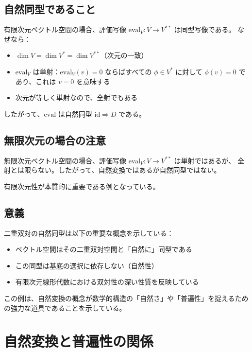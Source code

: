 \documentclass[uplatex,a4j,12pt,dvipdfmx]{jsarticle}
\begin{document}
\subsection{自然同型であること}

有限次元ベクトル空間の場合、評価写像 $\mathrm{eval}_V: V \to V^{**}$ は同型写像である。
なぜなら：
\begin{itemize}
	\item $\dim V = \dim V^* = \dim V^{**}$（次元の一致）
	\item $\mathrm{eval}_V$ は単射：$\mathrm{eval}_V(v) = 0$ ならばすべての $\phi \in V^*$ に対して $\phi(v) = 0$ であり、これは $v = 0$ を意味する
	\item 次元が等しく単射なので、全射でもある
\end{itemize}

したがって、$\mathrm{eval}$ は自然同型 $\mathrm{id} \Rightarrow D$ である。

\subsection{無限次元の場合の注意}

無限次元ベクトル空間の場合、評価写像 $\mathrm{eval}_V: V \to V^{**}$ は単射ではあるが、
全射とは限らない。したがって、自然変換ではあるが自然同型ではない。

有限次元性が本質的に重要である例となっている。

\subsection{意義}

二重双対の自然同型は以下の重要な概念を示している：
\begin{itemize}
	\item ベクトル空間はその二重双対空間と「自然に」同型である
	\item この同型は基底の選択に依存しない（自然性）
	\item 有限次元線形代数における双対性の深い性質を反映している
\end{itemize}

この例は、自然変換の概念が数学的構造の「自然さ」や「普遍性」を捉えるための強力な道具であることを示している。







\section{自然変換と普遍性の関係}
\end{document}
